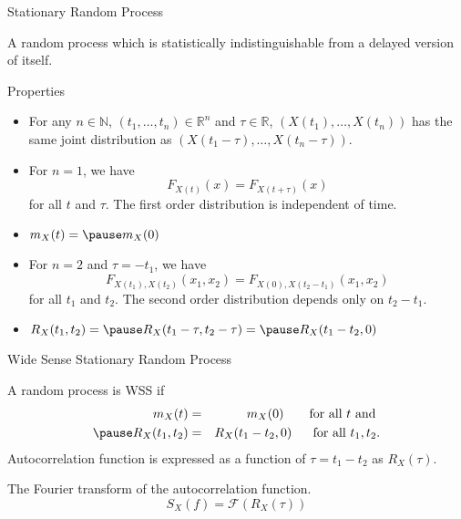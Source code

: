 \documentclass[t]{beamer}
\begin{document}
\begin{frame}{Stationary Random Process}
  \footnotesize
  \pause
  \begin{definition}[]
    A random process which is statistically indistinguishable from a delayed version of itself.
  \end{definition}
  \pause
  \begin{block}{Properties}
  \begin{itemize}
    \item For any $n \in \mathbb{N}$, $(t_1,\ldots,t_n) \in \mathbb{R}^n$ and $\tau \in \mathbb{R}$, $\left(X(t_1),\ldots,X(t_n)\right)$ has the same joint distribution as $\left(X(t_1-\tau),\ldots,X(t_n-\tau)\right)$.
     \item \pause For $n = 1$, we have
     \begin{equation*}
       F_{X(t)}(x) = F_{X(t+\tau)}(x)
     \end{equation*}
      for all $t$ and $\tau$. \pause The first order distribution is independent of time.
    \item \pause $m_X(t) = \pause m_X(0)$
    \item \pause For $n = 2$ and $\tau = -t_1$, we have
       \begin{equation*}
         F_{X(t_1), X(t_2)}(x_1, x_2) = F_{X(0),X(t_2-t_1)}(x_1, x_2)
       \end{equation*}
    for all $t_1$ and $t_2$. \pause The second order distribution depends only on $t_2 - t_1$.
    \item \pause $R_X(t_1,t_2) = \pause R_X(t_1-\tau,t_2-\tau) = \pause R_X(t_1-t_2,0)$
  \end{itemize}
  \end{block}
  \normalsize
\end{frame}

\begin{frame}{Wide Sense Stationary Random Process}
  \footnotesize
  \pause
  \begin{definition}[]
    A random process is WSS if
    \begin{eqnarray*}
      m_X(t) & = & m_X(0) \ \ \ \ \ \text{ for all $t$ and }\\
      \pause
      R_X(t_1,t_2) & = & R_X(t_1-t_2,0) \ \ \ \ \ \text{for all $t_1,t_2$.} \\
    \end{eqnarray*}
    \pause
    Autocorrelation function is expressed as a function of $\tau = t_1-t_2$ as $R_X(\tau)$.
  \end{definition}
  \pause
  \begin{definition}
    \pause
    The Fourier transform of the autocorrelation function.
    \pause
    \begin{equation*}
      S_X(f) = \mathcal{F}\left(R_X(\tau)\right)
    \end{equation*}
  \end{definition}
  \normalsize
\end{frame}
\end{document}
